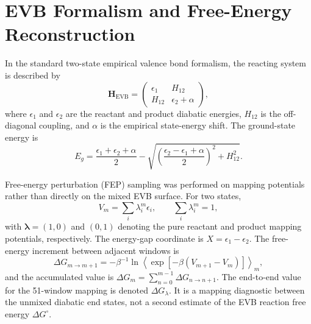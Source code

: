 \documentclass[journal=jpcbfk,manuscript=suppinfo]{achemso}
\begin{document}
\linenumbers


\newpage
\listoftables
\listoffigures
\setcounter{figure}{0}
\newpage
\section{EVB Formalism and Free-Energy Reconstruction}

In the standard two-state empirical valence bond formalism,\cite{warshel_empirical_1980} the reacting system is described by
\begin{equation}
\mathbf{H}_{\mathrm{EVB}}=
\begin{pmatrix}
\epsilon_1 & H_{12} \\
H_{12} & \epsilon_2 + \alpha
\end{pmatrix},
\label{eq:evb_hamiltonian}
\end{equation}
where $\epsilon_1$ and $\epsilon_2$ are the reactant and product diabatic energies, $H_{12}$ is the off-diagonal coupling, and $\alpha$ is the empirical state-energy shift. The ground-state energy is
\begin{equation}
E_g=\frac{\epsilon_1+\epsilon_2+\alpha}{2}
-\sqrt{\left(\frac{\epsilon_2-\epsilon_1+\alpha}{2}\right)^2+H_{12}^2}.
\label{eq:evb_ground_state}
\end{equation}

Free-energy perturbation (FEP) sampling was performed on mapping potentials rather than directly on the mixed EVB surface.\cite{marelius_q_1999,oanca_efficient_2023} For two states,
\begin{equation}
V_m=\sum_i\lambda_i^m\epsilon_i,\qquad \sum_i\lambda_i^m=1,
\label{eq:evb_mapping}
\end{equation}
with $\boldsymbol{\lambda}=(1,0)$ and $(0,1)$ denoting the pure reactant and product mapping potentials, respectively. The energy-gap coordinate is $X=\epsilon_1-\epsilon_2$. The free-energy increment between adjacent windows is
\begin{equation}
\Delta G_{m\rightarrow m+1}=-\beta^{-1}\ln\left\langle
\exp[-\beta(V_{m+1}-V_m)]\right\rangle_m,
\label{eq:fep_increment}
\end{equation}
and the accumulated value is $\Delta G_m=\sum_{n=0}^{m-1}\Delta G_{n\rightarrow n+1}$. The end-to-end value for the 51-window mapping is denoted $\Delta G_{\lambda}$. It is a mapping diagnostic between the unmixed diabatic end states, not a second estimate of the EVB reaction free energy $\Delta G^{\circ}$.
\end{document}
